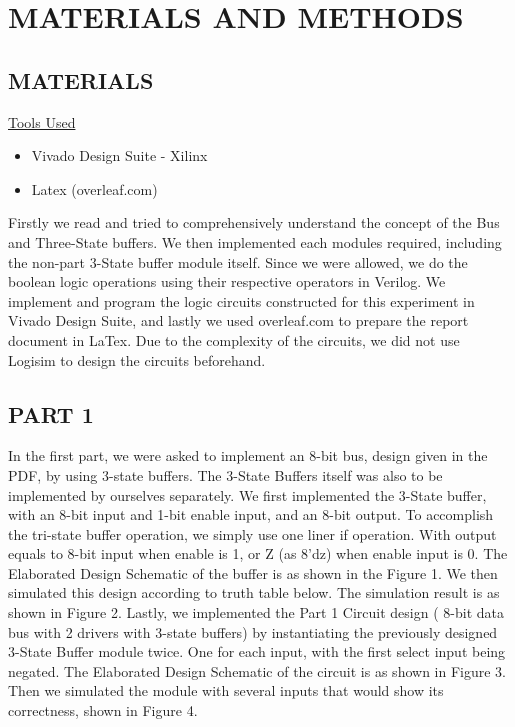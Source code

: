 \documentclass[pdftex,12pt,a4paper]{article}
\begin{document}
\section{MATERIALS AND METHODS}

\subsection{MATERIALS}
\underline{Tools Used}
\begin{itemize}
    \item {Vivado Design Suite - Xilinx}
    \item{Latex (overleaf.com)}
\end{itemize}
Firstly we read and tried to comprehensively understand the concept of the Bus and Three-State buffers. We then implemented each modules required, including the non-part 3-State buffer module itself. Since we were allowed, we do the boolean logic operations using their respective operators in Verilog.  We implement and program the logic circuits constructed for this experiment in Vivado Design Suite, and lastly we used overleaf.com to prepare the report document in LaTex. Due to the complexity of the circuits, we did not use Logisim to design the circuits beforehand. 

\subsection{PART 1}
In the first part, we were asked to implement an 8-bit bus, design given in the PDF, by using 3-state buffers. The 3-State Buffers itself was also to be implemented by ourselves separately. We first implemented the 3-State buffer, with an 8-bit input and 1-bit enable input, and an 8-bit output. To accomplish the tri-state buffer operation, we simply use one liner if operation. With output equals to 8-bit input when enable is 1, or Z (as 8'dz) when enable input is 0. The Elaborated Design Schematic of the buffer is as shown in the Figure 1. We then simulated this design according to truth table below. The simulation result is as shown in Figure 2. Lastly, we implemented the Part 1 Circuit design ( 8-bit data bus with 2 drivers with 3-state buffers) by instantiating the previously designed 3-State Buffer module twice. One for each input, with the first select input being negated. The Elaborated Design Schematic of the circuit is as shown in Figure 3. Then we simulated the module with several inputs that would show its correctness, shown in Figure 4.
\end{document}
